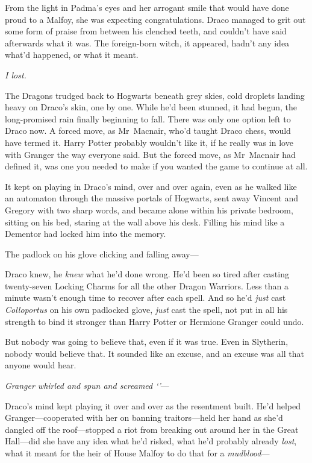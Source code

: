 From the light in Padma's eyes and her arrogant smile that would have done proud to a Malfoy, she was expecting congratulations. Draco managed to grit out some form of praise from between his clenched teeth, and couldn't have said afterwards what it was. The foreign-born witch, it appeared, hadn't any idea what'd happened, or what it meant.

\emph{I lost.}

The Dragons trudged back to Hogwarts beneath grey skies, cold droplets landing heavy on Draco's skin, one by one. While he'd been stunned, it had begun, the long-promised rain finally beginning to fall. There was only one option left to Draco now. A forced move, as Mr~Macnair, who'd taught Draco chess, would have termed it. Harry Potter probably wouldn't like it, if he really was in love with Granger the way everyone said. But the forced move, as Mr~Macnair had defined it, was one you needed to make if you wanted the game to continue at all.

It kept on playing in Draco's mind, over and over again, even as he walked like an automaton through the massive portals of Hogwarts, sent away Vincent and Gregory with two sharp words, and became alone within his private bedroom, sitting on his bed, staring at the wall above his desk. Filling his mind like a Dementor had locked him into the memory.

The padlock on his glove clicking and falling away—

Draco knew, he \emph{knew} what he'd done wrong. He'd been so tired after casting twenty-seven Locking Charms for all the other Dragon Warriors. Less than a minute wasn't enough time to recover after each spell. And so he'd \emph{just} cast \emph{Colloportus} on his own padlocked glove, \emph{just} cast the spell, not put in all his strength to bind it stronger than Harry Potter or Hermione Granger could undo.

But nobody was going to believe that, even if it was true. Even in Slytherin, nobody would believe that. It sounded like an excuse, and an excuse was all that anyone would hear.

\emph{Granger whirled and spun and screamed `'}—

Draco's mind kept playing it over and over as the resentment built. He'd helped Granger—cooperated with her on banning traitors—held her hand as she'd dangled off the roof—stopped a riot from breaking out around her in the Great Hall—did she have any idea what he'd risked, what he'd probably already \emph{lost}, what it meant for the heir of House Malfoy to do that for a \emph{mudblood}—


